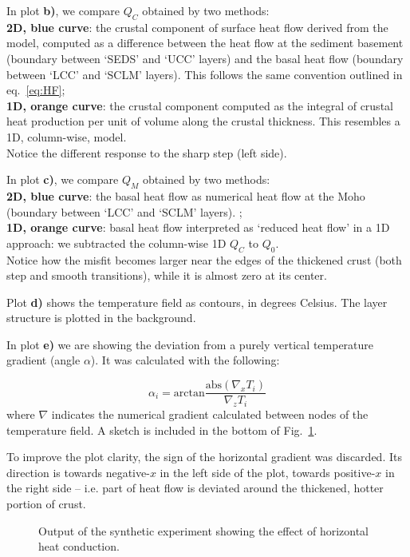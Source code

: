 {\begin{subappendices}
In plot \textbf{b)}, we compare $Q_C$ obtained by two methods:\\
\textbf{2D, blue curve}: the crustal component of surface heat flow derived from the model, computed as a difference between the heat flow at the sediment basement (boundary between `SEDS' and `UCC' layers) and the basal heat flow (boundary between `LCC' and `SCLM' layers). This follows the same convention outlined in eq.~\ref{eq:HF};\\
\textbf{1D, orange curve}: the crustal component computed as the integral of crustal heat production per unit of volume along the crustal thickness. This  resembles a 1D, column-wise, model.\\
Notice the different response to the sharp step (left side).

In plot \textbf{c)}, we compare $Q_M$ obtained by two methods:\\
\textbf{2D, blue curve}: the basal heat flow as numerical heat flow at the Moho (boundary between `LCC' and `SCLM' layers). ;\\
\textbf{1D, orange curve}: basal heat flow interpreted as `reduced heat flow' in a 1D approach: we subtracted the column-wise 1D $Q_C$ to $Q_0$.\\
Notice how the misfit becomes larger near the edges of the thickened crust (both step and smooth transitions), while it is almost zero at its center.

Plot \textbf{d)} shows the temperature field as contours, in degrees Celsius.
The layer structure is plotted in the background.

In plot \textbf{e)} we are showing the deviation from a purely vertical temperature gradient (angle $\alpha$).
It was calculated with the following:

\begin{equation}
    \alpha_i = \mathrm{arctan} \frac{\mathrm{abs}\left(\nabla_x T_i \right)}{\nabla_z T_i}
\label{eq:alpha}
\end{equation}
where $\nabla$ indicates the numerical gradient calculated between nodes of the temperature field.
A sketch is included in the bottom of Fig.~\ref{fig:2Deff}.

To improve the plot clarity, the sign of the horizontal gradient was discarded.
Its direction is towards negative-$x$ in the left side of the plot, towards positive-$x$ in the right side -- i.e. part of heat flow is deviated around the thickened, hotter portion of crust.

\begin{figure}
	\begin{adjustbox}{center}
	\end{adjustbox}
	\caption{Output of the synthetic experiment showing the effect of horizontal heat conduction.}
	\label{fig:2Deff}
\end{figure}


\end{subappendices}}
